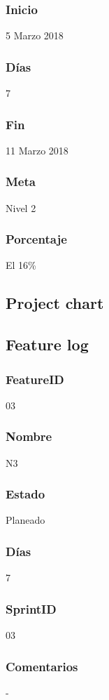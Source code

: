 \subsubsection{Inicio}
5 Marzo 2018
\subsubsection{Días}
7
\subsubsection{Fin}
11 Marzo 2018
\subsubsection{Meta}
Nivel 2
\subsubsection{Porcentaje}
El 16\% 


\subsection{Project chart}



\subsection{Feature log}

\subsubsection{FeatureID}
03
\subsubsection{Nombre}
N3
\subsubsection{Estado}
Planeado
\subsubsection{Días}
7
\subsubsection{SprintID}
03
\subsubsection{Comentarios}
-


